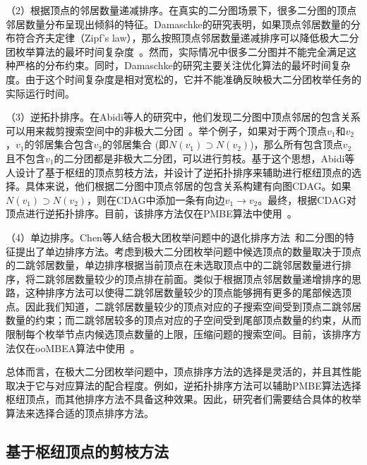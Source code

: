 （2）根据顶点的邻居数量递减排序。在真实的二分图场景下，很多二分图的顶点邻居数量分布呈现出倾斜的特征。Damaschke的研究表明，如果顶点邻居数量的分布符合齐夫定律（Zipf's law），那么按照顶点邻居数量递减排序可以降低极大二分团枚举算法的最坏时间复杂度~\cite{Damaschke14}。然而，实际情况中很多二分图并不能完全满足这种严格的分布约束。同时，Damaschke的研究主要关注优化算法的最坏时间复杂度。由于这个时间复杂度是相对宽松的，它并不能准确反映极大二分团枚举任务的实际运行时间。

（3）逆拓扑排序。在Abidi等人的研究中，他们发现二分图中顶点邻居的包含关系可以用来裁剪搜索空间中的非极大二分团~\cite{PMBE20}。举个例子，如果对于两个顶点$v_1$和$v_2$，$v_1$的邻居集合包含$v_2$的邻居集合 (即$N(v_1)\supset N(v_2)$)，那么所有包含顶点$v_2$且不包含$v_1$的二分团都是非极大二分团，可以进行剪枝。基于这个思想，Abidi等人设计了基于枢纽的顶点剪枝方法，并设计了逆拓扑排序来辅助进行枢纽顶点的选择。具体来说，他们根据二分图中顶点邻居的包含关系构建有向图CDAG。如果$N(v_1)\supset N(v_2)$，则在CDAG中添加一条有向边$v_1\rightarrow v_2$。最终，根据CDAG对顶点进行逆拓扑排序。目前，该排序方法仅在PMBE算法中使用~\cite{PMBE20}。

（4）单边排序。Chen等人结合极大团枚举问题中的退化排序方法~\cite{MCEdegeneracy10}和二分图的特征提出了单边排序方法。考虑到极大二分团枚举问题中候选顶点的数量取决于顶点的二跳邻居数量，单边排序根据当前顶点在未选取顶点中的二跳邻居数量进行排序，将二跳邻居数量较少的顶点排在前面。类似于根据顶点邻居数量递增排序的思路，这种排序方法可以使得二跳邻居数量较少的顶点能够拥有更多的尾部候选顶点。因此我们知道，二跳邻居数量较少的顶点对应的子搜索空间受到顶点二跳邻居数量的约束；而二跳邻居较多的顶点对应的子空间受到尾部顶点数量的约束，从而限制每个枚举节点内候选顶点数量的上限，压缩问题的搜索空间。目前，该排序方法仅在ooMBEA算法中使用~\cite{ooMBE22}。


总体而言，在极大二分团枚举问题中，顶点排序方法的选择是灵活的，并且其性能取决于它与对应算法的配合程度。例如，逆拓扑排序方法可以辅助PMBE算法选择枢纽顶点，而其他排序方法不具备这种效果。因此，研究者们需要结合具体的枚举算法来选择合适的顶点排序方法。

\subsection{基于枢纽顶点的剪枝方法}
\label{subsec:pivot}

